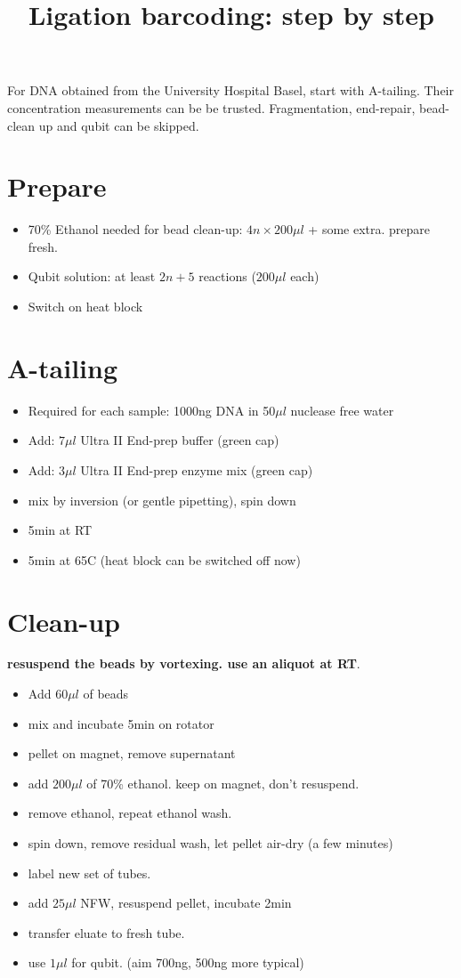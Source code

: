 \documentclass[aps,rmp]{revtex4}
\begin{document}
\title{Ligation barcoding: step by step}

\maketitle

For DNA obtained from the University Hospital Basel, start with A-tailing. Their concentration measurements can be be trusted. Fragmentation, end-repair, bead-clean up and qubit can be skipped.

\section*{Prepare}
\begin{itemize}
	\item 70\% Ethanol needed for bead clean-up: $4n\times 200\mu l$ + some extra. prepare fresh.
	\item Qubit solution: at least $2n+5$ reactions ($200\mu l $ each)
	\item Switch on heat block
\end{itemize}

\section*{A-tailing}
\begin{itemize}
	\item Required for each sample: 1000ng DNA in 50$\mu l$ nuclease free water
	\item Add: $7\mu l$ Ultra II End-prep buffer	(green cap)
	\item Add: $3\mu l$ Ultra II End-prep enzyme mix (green cap)
	\item mix by inversion (or gentle pipetting), spin down
	\item 5min at RT
	\item 5min at 65C (heat block can be switched off now)
\end{itemize}

\section*{Clean-up}
{\bf resuspend the beads by vortexing. use an aliquot at RT}.
\begin{itemize}
	\item Add $60\mu l$ of beads
	\item mix and incubate 5min on rotator
	\item pellet on magnet, remove supernatant
	\item add $200\mu l$ of 70\% ethanol. keep on magnet, don't resuspend.
	\item remove ethanol, repeat ethanol wash.
	\item spin down, remove residual wash, let pellet air-dry (a few minutes)
	\item label new set of tubes.
	\item add $25\mu l$ NFW, resuspend pellet, incubate 2min
	\item transfer eluate to fresh tube.
	\item use $1\mu l$ for qubit. (aim 700ng, 500ng more typical)
\end{itemize}
\end{document}
